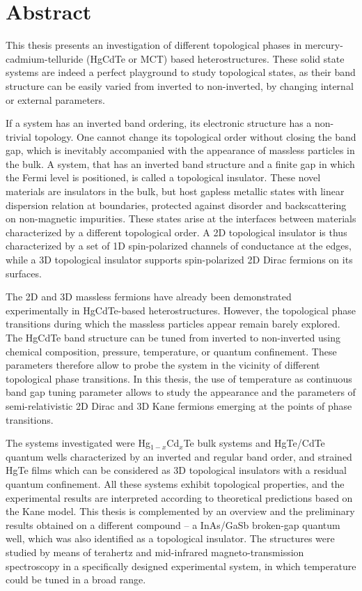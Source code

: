 \documentclass[titlepage,a4paper]{book}
\newcommand{\wciecie}{\quad\phantom{v}}
\begin{document}
\chapter*{Abstract}
\wciecie
This thesis presents an investigation of different topological phases in mercury-cadmium-telluride (HgCdTe or MCT) based heterostructures. These solid state systems are indeed a perfect playground to study topological states, as their band structure can be easily varied from inverted to non-inverted, by changing internal or external parameters. 

If a system has an inverted band ordering, its electronic structure has a non-trivial topology. One cannot change its topological order without closing the band gap, which is inevitably accompanied with the appearance of massless particles in the bulk. A system, that has an inverted band structure and a finite gap in which the Fermi level is positioned, is called a topological insulator. These novel materials are insulators in the bulk, but host gapless metallic states with linear dispersion relation at boundaries, protected against disorder and backscattering on non-magnetic impurities. These states arise at the interfaces between materials characterized by a different topological order. A 2D topological insulator is thus characterized by a set of 1D spin-polarized channels of conductance at the edges, while a 3D topological insulator supports spin-polarized 2D Dirac fermions on its surfaces.
 
The 2D and 3D massless fermions have already been demonstrated experimentally in HgCdTe-based heterostructures. However, the topological phase transitions during which the massless particles appear remain barely explored. The HgCdTe band structure can be tuned from inverted to non-inverted using chemical composition, pressure, temperature, or quantum confinement. These parameters therefore allow to probe the system in the vicinity of different topological phase transitions. In this thesis, the use of temperature as continuous band gap tuning parameter allows to study the appearance and the parameters of semi-relativistic 2D Dirac and 3D Kane fermions emerging at the points of phase transitions.
 
The systems investigated were Hg$_{1-x}$Cd$_x$Te bulk systems and HgTe/CdTe quantum wells characterized by an inverted and regular band order, and strained HgTe films which can be considered as 3D topological insulators with a residual quantum confinement. All these systems exhibit topological properties, and the experimental results are interpreted according to theoretical predictions based on the Kane model. This thesis is complemented by an overview and the preliminary results obtained on a different compound -- a InAs/GaSb broken-gap quantum well, which was also identified as a topological insulator. The structures were studied by means of terahertz and mid-infrared magneto-transmission spectroscopy in a specifically designed experimental system, in which temperature could be tuned in a broad range. 
\end{document}
